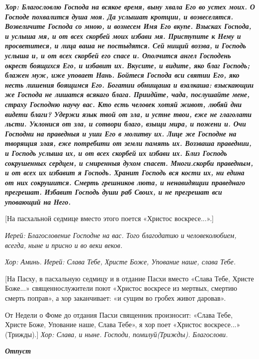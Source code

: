 \bfseries  \normalfont{}\itshape  Хор:\normalfont{} Благословлю Господа на всякое время, выну хвала Его во устех моих. О Господе похвалится душа моя. Да услышат кротции, и возвеселятся. Возвеличите Господа со мною, и вознесем Имя Его вкупе. Взысках Господа, и услыша мя, и от всех скорбей моих избави мя. Приступите к Нему и просветитеся, и лица ваша не постыдятся. Сей нищий воззва, и Господь услыша и, и от всех скорбей его спасе и. Ополчится ангел Господень окрест боящихся Его, и избавит их. Вкусите, и видите, яко благ Господь; блажен муж, иже уповает Нань. Бойтеся Господа вси святии Его, яко несть лишения боящимся Его. Богатии обнищаша и взалкаша: взыскающии же Господа не лишатся всякаго блага. Приидйте, чада, послушайте мене, страху Господню научу вас. Кто есть человек хотяй живот, любяй дни видети благи? Удержи язык твой от зла, и устне твои, еже не глаголати льсти. Уклонися от зла, и сотвори благо, взыщи мира, и пожени и. Очи Господни на праведныя и уши Его в молитву их. Лице же Господне на творящия злая, еже потребити от земли память их. Воззваша праведнии, и Господь услыша их, и от всех скорбей их избави их. Близ Господь сокрушенных сердцем, и смиренныя духом спасет. Многи.скорби праведным, и от всех их избавит я Господь. Хранит Господь вся кости их, ни едина от них сокрушится. Смерть грешников люта, и ненавидящии праведнаго прегрешат. Избавит Господь души раб Своих, и не прегрешат вси уповающий на Него.


  [На пасхальной седмице вместо этого поется «Христос воскресе...».]


 \itshape  Иерей:\normalfont{} Благословение Господне на вас. Того благодатию и человеколюбием, всегда, ныне и присно и во веки веков.


\itshape  Хор:\normalfont{} Аминь. \itshape  Иерей:\normalfont{} Слава Тебе, Христе Боже, Упование наше, слава Тебе.


    [На Пасху, в пасхальную седмицу и в отдание Пасхи вместо «Слава Тебе, Христе Боже...» священнослужители поют «Христос воскресе из мертвых, смертию смерть поправ», а хор заканчивает: «и сущим во гробех живот даровав». 


    От Недели о Фоме до отдания Пасхи священник произносит: «Слава Тебе, Христе Боже, Упование наше, Слава Тебе», я хор поет «Христос воскресе...» (Трижды).] \itshape  Хор: Слава, и ныне.\normalfont{} Господи, помилуй\itshape  (Трижды).\normalfont{} Благослови. 


\medskip


 \bfseries \itshape  Отпуст \normalfont{}\normalfont{}


